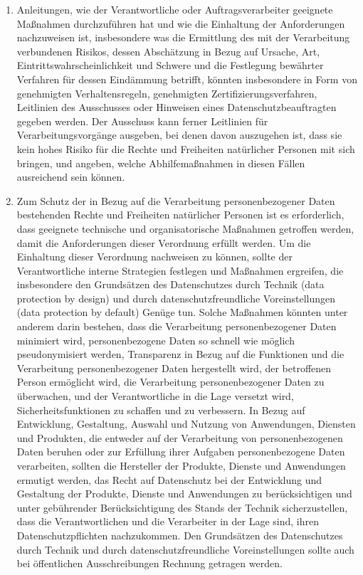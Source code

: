 \begin{enumerate}

   \item Anleitungen, wie der Verantwortliche oder Auftragsverarbeiter geeignete Maßnahmen durchzuführen hat und wie die
    Einhaltung der Anforderungen nachzuweisen ist, insbesondere was die Ermittlung des mit der Verarbeitung verbundenen
    Risikos, dessen Abschätzung in Bezug auf Ursache, Art, Eintrittswahrscheinlichkeit und Schwere und die Festlegung
    bewährter Verfahren für dessen Eindämmung betrifft, könnten insbesondere in Form von genehmigten Verhaltensregeln,
    genehmigten Zertifizierungsverfahren, Leitlinien des Ausschusses oder Hinweisen eines Datenschutzbeauftragten
    gegeben werden. Der Ausschuss kann ferner Leitlinien für Verarbeitungsvorgänge ausgeben, bei denen davon auszugehen
    ist, dass sie kein hohes Risiko für die Rechte und Freiheiten natürlicher Personen mit sich bringen, und angeben,
    welche Abhilfemaßnahmen in diesen Fällen ausreichend sein können.%
   \label{itm:eg-77}
   

   \item Zum Schutz der in Bezug auf die Verarbeitung personenbezogener Daten bestehenden Rechte und Freiheiten
    natürlicher Personen ist es erforderlich, dass geeignete technische und organisatorische Maßnahmen getroffen
    werden, damit die Anforderungen dieser Verordnung erfüllt werden. Um die Einhaltung dieser Verordnung nachweisen zu
    können, sollte der Verantwortliche interne Strategien festlegen und Maßnahmen ergreifen, die insbesondere den
    Grundsätzen des Datenschutzes durch Technik (data protection by design) und durch datenschutzfreundliche
    Voreinstellungen (data protection by default) Genüge tun. Solche Maßnahmen könnten unter anderem darin bestehen,
    dass die Verarbeitung personenbezogener Daten minimiert wird, personenbezogene Daten so schnell wie möglich
    pseudonymisiert werden, Transparenz in Bezug auf die Funktionen und die Verarbeitung personenbezogener Daten
    hergestellt wird, der betroffenen Person ermöglicht wird, die Verarbeitung personenbezogener Daten zu überwachen,
    und der Verantwortliche in die Lage versetzt wird, Sicherheitsfunktionen zu schaffen und zu verbessern. In Bezug
    auf Entwicklung, Gestaltung, Auswahl und Nutzung von Anwendungen, Diensten und Produkten, die entweder auf der
    Verarbeitung von personenbezogenen Daten beruhen oder zur Erfüllung ihrer Aufgaben personenbezogene Daten
    verarbeiten, sollten die Hersteller der Produkte, Dienste und Anwendungen ermutigt werden, das Recht auf
    Datenschutz bei der Entwicklung und Gestaltung der Produkte, Dienste und Anwendungen zu berücksichtigen und unter
    gebührender Berücksichtigung des Stands der Technik sicherzustellen, dass die Verantwortlichen und die Verarbeiter
    in der Lage sind, ihren Datenschutzpflichten nachzukommen. Den Grundsätzen des Datenschutzes durch Technik und
    durch datenschutzfreundliche Voreinstellungen sollte auch bei öffentlichen Ausschreibungen Rechnung getragen
    werden.%
   \label{itm:eg-78}
   

\end{enumerate}
